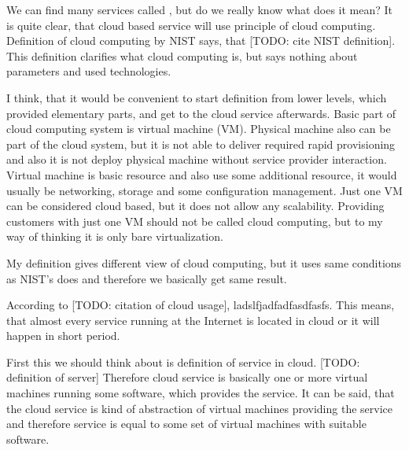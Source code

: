 
We can find many services called , but do we really know what does it mean? It is quite clear, that cloud based service will use principle of cloud computing. Definition of cloud computing by \Ac{NIST} says, that  [TODO: cite NIST definition]. This definition clarifies what cloud computing is, but says nothing about parameters and used technologies.

I think, that it would be convenient to start definition from lower levels, which provided elementary parts, and get to the cloud service afterwards. Basic part of cloud computing system is virtual machine (\Ac{VM}). Physical machine also can be part of the cloud system, but it is not able to deliver required rapid provisioning and also it is not deploy physical machine without service provider interaction. Virtual machine is basic resource and also use some additional resource, it would usually be networking, storage and some configuration management. Just one \Ac{VM} can be considered cloud based, but it does not allow any scalability. Providing customers with just one \Ac{VM} should not be called cloud computing, but to my way of thinking it is only bare virtualization.


My definition gives different view of cloud computing, but it uses same conditions as \Ac{NIST}'s does and therefore we basically get same result.




According to [TODO: citation of cloud usage], ladslfjadfadfasdfasfs. This means, that almost every service running at the Internet is located in cloud or it will happen in short period. 

First this we should think about is definition of service in cloud. [TODO: definition of server] Therefore cloud service is basically one or more virtual machines running some software, which provides the service. It can be said, that the cloud service is kind of abstraction of virtual machines providing the service and therefore service is equal to some set of virtual machines with suitable software.


